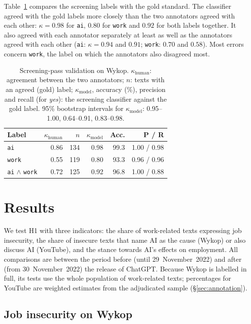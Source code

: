 \documentclass[11pt]{article}
\begin{document}
Table~\ref{tab:validation} compares the screening labels with the gold
standard. The classifier agreed with the gold labels more closely than the
two annotators agreed with each other: $\kappa = 0.98$ for \texttt{ai},
$0.80$ for \texttt{work} and $0.92$ for both labels together. It also agreed
with each annotator separately at least as well as the annotators agreed
with each other (\texttt{ai}: $\kappa = 0.94$ and $0.91$; \texttt{work}:
$0.70$ and $0.58$). Most errors concern \texttt{work}, the label on which
the annotators also disagreed most. 

\begin{table}[t]
\centering
\small
\begin{tabular}{lrrrrr}
\toprule
Label & $\kappa_{\text{human}}$ & $n$ & $\kappa_{\text{model}}$ & Acc. & P / R \\
\midrule
\texttt{ai}              & 0.86 & 134 & 0.98 & 99.3 & 1.00 / 0.98 \\
\texttt{work}            & 0.55 & 119 & 0.80 & 93.3 & 0.96 / 0.96 \\
\texttt{ai} $\wedge$ \texttt{work} & 0.72 & 125 & 0.92 & 96.8 & 1.00 / 0.88 \\
\bottomrule
\end{tabular}
\caption{Screening-pass validation on Wykop. $\kappa_{\text{human}}$:
agreement between the two annotators; $n$: texts with an agreed (gold)
label; $\kappa_{\text{model}}$, accuracy (\%), precision and recall (for
\textit{yes}): the screening classifier against the gold label. 95\%
bootstrap intervals for $\kappa_{\text{model}}$: 0.95--1.00, 0.64--0.91,
0.83--0.98.}
\label{tab:validation}
\end{table}

\section{Results}
\label{sec:results}

We test H1 with three indicators: the share of work-related texts expressing
job insecurity, the share of insecure texts that name AI as the cause (Wykop) or
also discuss AI (YouTube), and the stance towards AI's effects on employment.
All comparisons are between the period before (until 29~November~2022) and
after (from 30~November~2022) the release of ChatGPT. Because Wykop is labelled
in full, its tests use the whole population of work-related texts; percentages
for YouTube are weighted estimates from the adjudicated sample
(\S\ref{sec:annotation}).

\subsection{Job insecurity on Wykop}
\end{document}

